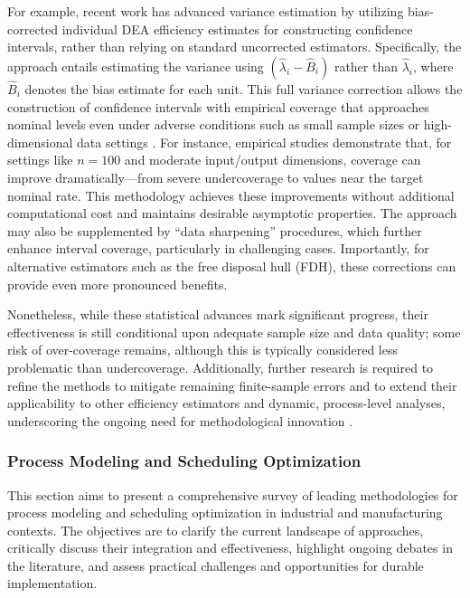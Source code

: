 \documentclass[sigconf]{acmart}
\begin{document}
For example, recent work has advanced variance estimation by utilizing bias-corrected individual DEA efficiency estimates for constructing confidence intervals, rather than relying on standard uncorrected estimators. Specifically, the approach entails estimating the variance using $(\hat{\lambda}_i - \hat{B}_i)$ rather than $\hat{\lambda}_i$, where $\hat{B}_i$ denotes the bias estimate for each unit. This full variance correction allows the construction of confidence intervals with empirical coverage that approaches nominal levels even under adverse conditions such as small sample sizes or high-dimensional data settings \cite{ref87}. For instance, empirical studies demonstrate that, for settings like $n=100$ and moderate input/output dimensions, coverage can improve dramatically—from severe undercoverage to values near the target nominal rate. This methodology achieves these improvements without additional computational cost and maintains desirable asymptotic properties. The approach may also be supplemented by ``data sharpening'' procedures, which further enhance interval coverage, particularly in challenging cases. Importantly, for alternative estimators such as the free disposal hull (FDH), these corrections can provide even more pronounced benefits.

Nonetheless, while these statistical advances mark significant progress, their effectiveness is still conditional upon adequate sample size and data quality; some risk of over-coverage remains, although this is typically considered less problematic than undercoverage. Additionally, further research is required to refine the methods to mitigate remaining finite-sample errors and to extend their applicability to other efficiency estimators and dynamic, process-level analyses, underscoring the ongoing need for methodological innovation \cite{ref87}.

\subsubsection{Process Modeling and Scheduling Optimization}

This section aims to present a comprehensive survey of leading methodologies for process modeling and scheduling optimization in industrial and manufacturing contexts. The objectives are to clarify the current landscape of approaches, critically discuss their integration and effectiveness, highlight ongoing debates in the literature, and assess practical challenges and opportunities for durable implementation.
\end{document}
